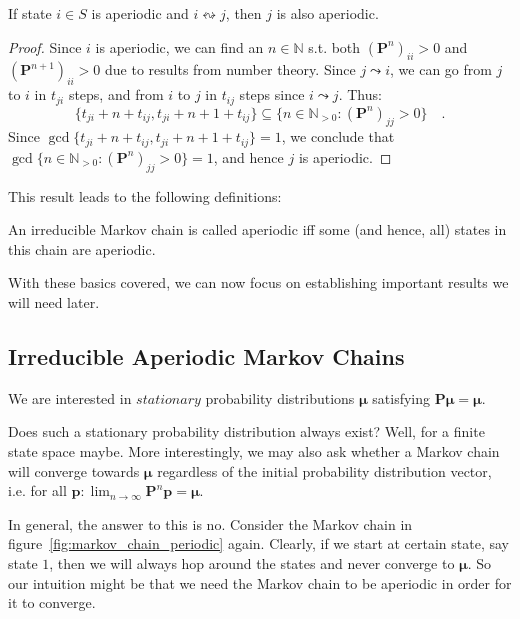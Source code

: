 \documentclass[../../main.tex]{subfiles}
\begin{document}
\begin{lemma}
    If state $i \in S$ is aperiodic and $i \leftrightsquigarrow j$, then $j$ is also aperiodic.
\end{lemma}
\vspace{-2.5em}
\begin{proof}
    Since $i$ is aperiodic, we can find an $n \in \mathbb{N}$ s.t. both $(\bm{P}^n)_{ii} > 0$ and $(\bm{P}^{n+1})_{ii} > 0$ due to results from number theory. Since $j \leadsto i$, we can go from $j$ to $i$ in $t_{ji}$ steps, and from $i$ to $j$ in $t_{ij}$ steps since $i \leadsto j$. Thus:
    \[
        \{ t_{ji} + n + t_{ij}, t_{ji} + n + 1 + t_{ij} \} \subseteq \{ n \in \mathbb{N}_{>0} : (\bm{P}^n)_{jj} > 0 \} \quad .
    \]
    Since $\gcd \{ t_{ji} + n + t_{ij}, t_{ji} + n + 1 + t_{ij} \} = 1$, we conclude that $\gcd \{ n \in \mathbb{N}_{>0} : (\bm{P}^n)_{jj} > 0 \} = 1$, and hence $j$ is aperiodic.
\end{proof}

This result leads to the following definitions:

\begin{definition}
    An irreducible Markov chain is called aperiodic iff some (and hence, all) states in this chain are aperiodic.   
\end{definition}

With these basics covered, we can now focus on establishing important results we will need later.

\subsection{Irreducible Aperiodic Markov Chains}
We are interested in $stationary$ probability distributions $\bm{\mu}$ satisfying $\bm{P \mu} = \bm{\mu}$.

Does such a stationary probability distribution always exist? Well, for a finite state space maybe. More interestingly, we may also ask whether a Markov chain will converge towards $\bm{\mu}$ regardless of the initial probability distribution vector, i.e. for all $\bm{p}: \lim_{n \to \infty} \bm{P}^n \bm{p} = \bm{\mu} $.

In general, the answer to this is no. Consider the Markov chain in figure~\ref{fig:markov_chain_periodic} again. Clearly, if we start at certain state, say state $1$, then we will always hop around the states and never converge to $\bm{\mu}$. So our intuition might be that we need the Markov chain to be aperiodic in order for it to converge.
\end{document}
